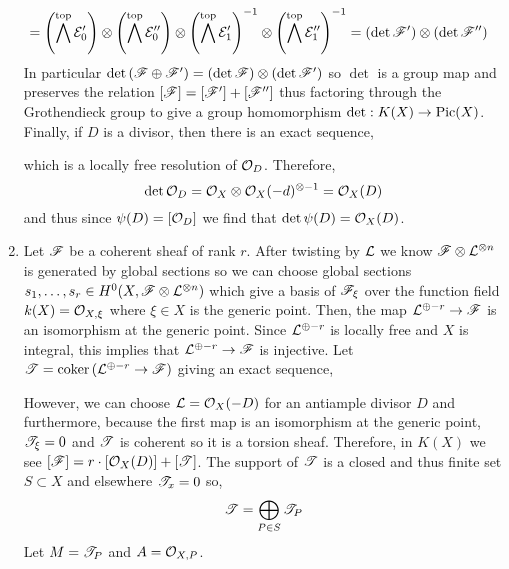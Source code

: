 \documentclass[12pt]{article}
\begin{document}
\begin{enumerate}
\begin{align*}
\\
& = \left( \bigwedge^{\mathrm{top}} \mathcal{E}_0' \right) \otimes \left( \bigwedge^{\mathrm{top}} \mathcal{E}_0'' \right) \otimes \left( \bigwedge^{\mathrm{top}} \mathcal{E}_1' \right)^{-1} \otimes \left( \bigwedge^{\mathrm{top}} \mathcal{E}_1'' \right)^{-1} = (\det{\mathscr{F}'}) \otimes (\det{\mathscr{F}''}) 
\end{align*}
In particular $\det{(\mathscr{F}\oplus \mathscr{F}')} = (\det{\mathscr{F}}) \otimes (\det{\mathscr{F}'})$ so $\det$ is a group map and preserves the relation $[\mathscr{F}] = [\mathscr{F}'] + [\mathscr{F}'']$ thus factoring through the Grothendieck group to give a group homomorphism $\det : K(X) \to \mathrm{Pic}(X)$. Finally, if $D$ is a divisor, then there is an exact sequence,
\begin{center}
\end{center}
which is a locally free resolution of $\mathcal{O}_{D}$. Therefore,
\[ \det{\mathcal{O}_{D}} = \mathcal{O}_{X} \otimes \mathcal{O}_{X}(-d)^{\otimes - 1} = \mathcal{O}_{X}(D) \]
and thus since $\psi(D) = [\mathcal{O}_{D}]$ we find that $\det{\psi(D)} = \mathcal{O}_{X}(D)$.
\item Let $\mathscr{F}$ be a coherent sheaf of rank $r$. After twisting by $\mathcal{L}$ we know $\mathscr{F} \otimes \mathcal{L}^{\otimes n}$ is generated by global sections so we can choose global sections $s_1, \dots, s_r \in H^0(X, \mathscr{F} \otimes \mathcal{L}^{\otimes n})$ which give a basis of $\mathscr{F}_{\xi}$ over the function field $k(X) = \mathcal{O}_{X, \xi}$ where $\xi \in X$ is the generic point. Then, the map $\mathcal{L}^{\oplus -r} \to \mathscr{F}$ is an isomorphism at the generic point. Since $\mathcal{L}^{\oplus -r}$ is locally free and $X$ is integral, this implies that $\mathcal{L}^{\oplus -r} \to \mathscr{F}$ is injective. Let $\mathscr{T} = \operatorname{\mathrm{coker}}{(\mathcal{L}^{\oplus -r} \to \mathscr{F})}$ giving an exact sequence,
\begin{center}
\end{center}
However, we can choose $\mathcal{L} = \mathcal{O}_{X}(-D)$ for an antiample divisor $D$ and furthermore, because the first map is an isomorphism at the generic point, $\mathscr{T}_\xi = 0$ and $\mathscr{T}$ is coherent so it is a torsion sheaf. Therefore, in $K(X)$ we see $[\mathscr{F}] = r \cdot [\mathcal{O}_{X}(D)] + [\mathscr{T}]$. The support of $\mathscr{T}$ is a closed and thus finite set $S \subset X$ and elsewhere $\mathscr{T}_x = 0$ so,
\[ \mathscr{T} = \bigoplus_{P \in S} \mathscr{T}_P \]
Let $M = \mathscr{T}_P$ and $A = \mathcal{O}_{X, P}$.

\end{enumerate}
\end{document}
